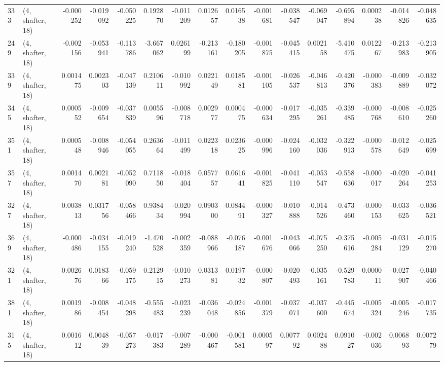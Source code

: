\begin{tabular}{llrrrrrrrrrrrrrr}
333 &  (4, shafter, 18) &  -0.000252 & -0.019092 & -0.050225 &     0.192870 &  -0.011209 &   0.012657 &   0.016538 & -0.001681 & -0.038547 & -0.069047 &   -0.695894 &  0.000238 & -0.014826 & -0.048635 \\
249 &  (4, shafter, 18) &  -0.002156 & -0.053941 & -0.113786 &    -3.667062 &   0.026199 &  -0.213161 &  -0.180205 & -0.001875 & -0.045415 &  0.002158 &   -5.410475 &  0.012267 & -0.213983 & -0.213905 \\
339 &  (4, shafter, 18) &   0.001475 &  0.002303 & -0.047139 &     0.210611 &  -0.010992 &   0.022149 &   0.018581 & -0.001105 & -0.026537 & -0.046813 &   -0.420376 & -0.000383 & -0.009889 & -0.032072 \\
345 &  (4, shafter, 18) &   0.000552 & -0.009654 & -0.037839 &     0.005596 &  -0.008718 &   0.002977 &   0.000475 & -0.000634 & -0.017295 & -0.035261 &   -0.339485 & -0.000768 & -0.008610 & -0.025260 \\
351 &  (4, shafter, 18) &   0.000548 & -0.008946 & -0.054055 &     0.263664 &  -0.011499 &   0.022318 &   0.023625 & -0.000996 & -0.024160 & -0.032036 &   -0.322913 & -0.000578 & -0.012649 & -0.025699 \\
357 &  (4, shafter, 18) &   0.001470 &  0.002181 & -0.052090 &     0.711850 &  -0.018404 &   0.057757 &   0.061641 & -0.001825 & -0.041110 & -0.053547 &   -0.558636 & -0.000017 & -0.020264 & -0.041253 \\
327 &  (4, shafter, 18) &   0.003813 &  0.031756 & -0.058466 &     0.938434 &  -0.020994 &   0.090300 &   0.084491 & -0.000327 & -0.010888 & -0.014526 &   -0.473460 & -0.000153 & -0.033625 & -0.036521 \\
369 &  (4, shafter, 18) &  -0.000486 & -0.034155 & -0.019240 &    -1.470528 &  -0.002359 &  -0.088966 &  -0.076187 & -0.001676 & -0.043066 & -0.075250 &   -0.375616 & -0.005284 & -0.031129 & -0.015270 \\
321 &  (4, shafter, 18) &   0.002676 &  0.018366 & -0.059175 &     0.212915 &  -0.010273 &   0.031381 &   0.019732 & -0.000807 & -0.020493 & -0.035161 &   -0.529783 &  0.000011 & -0.027907 & -0.040466 \\
381 &  (4, shafter, 18) &   0.001986 & -0.008454 & -0.048298 &    -0.555483 &  -0.023239 &  -0.036048 &  -0.024856 & -0.001379 & -0.037071 & -0.037600 &   -0.445674 & -0.005324 & -0.005246 & -0.017735 \\
315 &  (4, shafter, 18) &   0.001612 &  0.004839 & -0.057273 &    -0.017383 &  -0.007289 &  -0.000467 &  -0.001581 &  0.000597 &  0.007792 &  0.002488 &    0.091027 & -0.002036 &  0.006893 &  0.007279 \\

\end{tabular}
